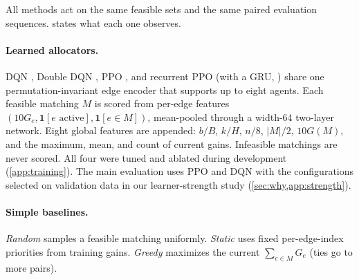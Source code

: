 \documentclass[10pt]{article}
\begin{document}
All methods act on the same feasible sets and the same paired evaluation sequences.  states what each one observes.

\paragraph{Learned allocators.} DQN \citep{mnih2015human}, Double DQN \citep{vanhasselt2016deep}, PPO \citep{schulman2017proximal}, and recurrent PPO (with a GRU, \citealp{cho2014learning}) share one permutation-invariant edge encoder \citep{zaheer2017deep} that supports up to eight agents. Each feasible matching $M$ is scored from per-edge features $(10G_e,\mathbf 1[e\text{ active}],\mathbf 1[e\in M])$, mean-pooled through a width-64 two-layer network. Eight global features are appended: $b/B$, $k/H$, $n/8$, $|M|/2$, $10G(M)$, and the maximum, mean, and count of current gains. Infeasible matchings are never scored. All four were tuned and ablated during development (\cref{app:training}). The main evaluation uses PPO and DQN with the configurations selected on validation data in our learner-strength study (\cref{sec:why,app:strength}).

\paragraph{Simple baselines.} \emph{Random} samples a feasible matching uniformly. \emph{Static} uses fixed per-edge-index priorities from training gains. \emph{Greedy} maximizes the current $\sum_{e\in M}G_e$ (ties go to more pairs).
\end{document}
